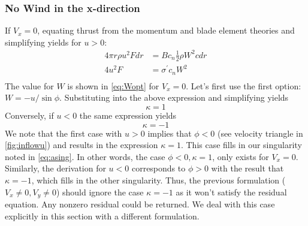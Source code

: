 \documentclass{article}
\begin{document}
\subsubsection{No Wind in the x-direction}
If $V_x = 0$, equating thrust from the momentum and blade element theories and simplifying yields for $u > 0$:
\begin{equation}
\begin{aligned}
    4 \pi r \rho u^2 F dr &= B c_n \frac{1}{2} \rho W^2 c dr\\
    4 u^2 F&= \sigma^\prime c_n W^2\\
\end{aligned}
\end{equation}
The value for $W$ is shown in \cref{eq:Wopt} for $V_x = 0$.  Let's first use the first option: $W = -u/\sin\phi$.  Substituting into the above expression and simplifying yields
\begin{equation}
\kappa = 1
\end{equation}
Conversely, if $u < 0$ the same expression yields
\begin{equation}
\kappa = -1
\end{equation}
We note that the first case with $u > 0$ implies that $\phi < 0$ (see velocity  triangle in \cref{fig:inflowu}) and results in the expression $\kappa = 1$.  This case fills in our singularity noted in \cref{eq:asing}.  In other words, the case $\phi < 0, \kappa = 1$, only exists for $V_x = 0$.  Similarly, the derivation for $u < 0$ corresponds to $\phi > 0$ with the result that $\kappa = -1$, which fills in the other singularity.  Thus, the previous formulation ($V_x \ne 0, V_y \ne 0$) should ignore the case $\kappa = -1$ as it won't satisfy the residual equation.  Any nonzero residual could be returned.  We deal with this case explicitly in this section with a different formulation.
\end{document}
